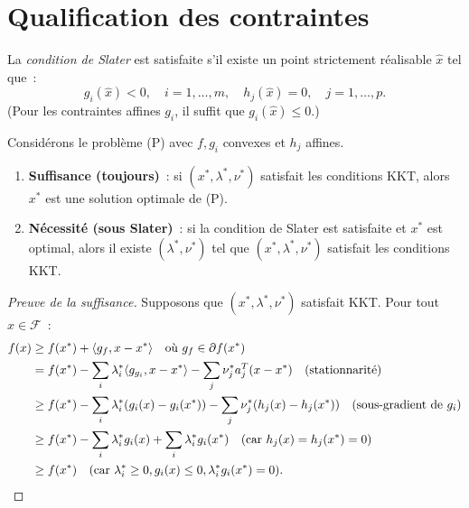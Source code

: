 \section{Qualification des contraintes}

\begin{definition}
La \emph{condition de Slater} est satisfaite s'il existe un point strictement
r\'ealisable $\hat{x}$ tel que~:
\[
    g_i(\hat{x}) < 0, \quad i = 1, \ldots, m, \quad
    h_j(\hat{x}) = 0, \quad j = 1, \ldots, p.
\]
(Pour les contraintes affines $g_i$, il suffit que $g_i(\hat{x}) \leq 0$.)
\end{definition}

\begin{theoreme}
\label{thm:kkt}
Consid\'erons le probl\`eme (P) avec $f, g_i$ convexes et $h_j$ affines.
\begin{enumerate}
    \item \textbf{Suffisance (toujours)}~: si $(x^*, \lambda^*, \nu^*)$ satisfait
    les conditions KKT, alors $x^*$ est une solution optimale de (P).
    \item \textbf{N\'ecessit\'e (sous Slater)}~: si la condition de Slater est
    satisfaite et $x^*$ est optimal, alors il existe $(\lambda^*, \nu^*)$ tel que
    $(x^*, \lambda^*, \nu^*)$ satisfait les conditions KKT.
\end{enumerate}
\end{theoreme}

\begin{proof}[Preuve de la suffisance]
Supposons que $(x^*, \lambda^*, \nu^*)$ satisfait KKT. Pour tout $x \in \mathcal{F}$~:
\begin{align*}
    f(x) &\geq f(x^*) + \langle g_f, x - x^* \rangle
    \quad \text{o\`u } g_f \in \partial f(x^*) \\
    &= f(x^*) - \sum_i \lambda_i^* \langle g_{g_i}, x-x^* \rangle - \sum_j \nu_j^* a_j^T(x-x^*)
    \quad \text{(stationnarit\'e)} \\
    &\geq f(x^*) - \sum_i \lambda_i^*(g_i(x) - g_i(x^*)) - \sum_j \nu_j^*(h_j(x) - h_j(x^*))
    \quad \text{(sous-gradient de } g_i) \\
    &\geq f(x^*) - \sum_i \lambda_i^* g_i(x) + \sum_i \lambda_i^* g_i(x^*)
    \quad \text{(car } h_j(x) = h_j(x^*) = 0) \\
    &\geq f(x^*) \quad \text{(car } \lambda_i^* \geq 0, g_i(x) \leq 0,
    \lambda_i^* g_i(x^*) = 0).
\end{align*}
\end{proof}

